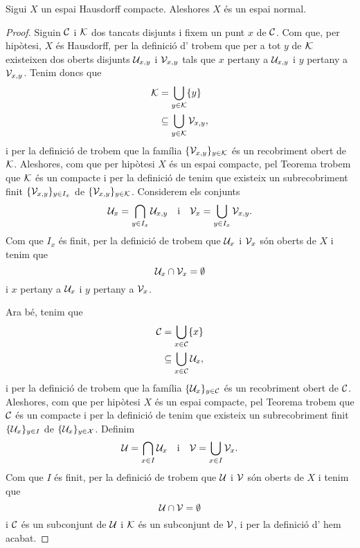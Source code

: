 \documentclass[../../Main.tex]{subfiles}
\begin{document}
	\begin{theorem}
		\label{thm:els espais Hausdorff compactes són espais normals}
		Sigui \(X\) un espai Hausdorff compacte. Aleshores \(X\) és un espai normal.
		\begin{proof} %
			Siguin \(\mathcal{C}\) i \(\mathcal{K}\) dos tancats disjunts i fixem un punt \(x\) de \(\mathcal{C}\). Com que, per hipòtesi, \(X\) és Hausdorff, per la definició d' trobem que per a tot \(y\) de \(\mathcal{K}\) existeixen dos oberts disjunts \(\mathcal{U}_{x,y}\) i \(\mathcal{V}_{x,y}\) tals que \(x\) pertany a \(\mathcal{U}_{x,y}\) i \(y\) pertany a \(\mathcal{V}_{x,y}\). Tenim doncs que
			\begin{align*}
				\mathcal{K}&=\bigcup_{y\in\mathcal{K}}\{y\} \\
				&\subseteq\bigcup_{y\in\mathcal{K}}\mathcal{V}_{x,y},
			\end{align*}
			i per la definició de  trobem que la família \(\{\mathcal{V}_{x,y}\}_{y\in\mathcal{K}}\) és un recobriment obert de \(\mathcal{K}\). Aleshores, com que per hipòtesi \(X\) és un espai compacte, pel Teorema  trobem que \(\mathcal{K}\) és un compacte i per la definició de  tenim que existeix un subrecobriment finit \(\{\mathcal{V}_{x,y}\}_{y\in I_{x}}\) de \(\{\mathcal{V}_{x,y}\}_{y\in\mathcal{K}}\). Considerem els conjunts
			\[
			    \mathcal{U}_{x}=\bigcap_{y\in I_{x}}\mathcal{U}_{x,y}\quad\text{i}\quad\mathcal{V}_{x}=\bigcup_{y\in I_{x}}\mathcal{V}_{x,y}.
			\]
			Com que \(I_{x}\) és finit, per la definició de  trobem que \(\mathcal{U}_{x}\) i \(\mathcal{V}_{x}\) són oberts de \(X\) i tenim que
			\[
			    \mathcal{U}_{x}\cap\mathcal{V}_{x}=\emptyset
			\]
			i \(x\) pertany a \(\mathcal{U}_{x}\) i \(y\) pertany a \(\mathcal{V}_{x}\).
			
			Ara bé, tenim que
			\begin{align*}
				\mathcal{C}&=\bigcup_{x\in\mathcal{C}}\{x\} \\
				&\subseteq\bigcup_{x\in\mathcal{C}}\mathcal{U}_{x},
			\end{align*}
			i per la definició de  trobem que la família \(\{\mathcal{U}_{x}\}_{y\in\mathcal{C}}\) és un recobriment obert de \(\mathcal{C}\). Aleshores, com que per hipòtesi \(X\) és un espai compacte, pel Teorema  trobem que \(\mathcal{C}\) és un compacte i per la definició de  tenim que existeix un subrecobriment finit \(\{\mathcal{U}_{x}\}_{y\in I}\) de \(\{\mathcal{U}_{x}\}_{y\in\mathcal{X}}\). Definim
			\[
			    \mathcal{U}=\bigcap_{x\in I}\mathcal{U}_{x}\quad\text{i}\quad\mathcal{V}=\bigcup_{x\in I}\mathcal{V}_{x}.
			\]
			Com que \(I\) és finit, per la definició de  trobem que \(\mathcal{U}\) i \(\mathcal{V}\) són oberts de \(X\) i tenim que
			\[
			    \mathcal{U}\cap\mathcal{V}=\emptyset
			\]
			i \(\mathcal{C}\) és un subconjunt de \(\mathcal{U}\) i \(\mathcal{K}\) és un subconjunt de \(\mathcal{V}\), i per la definició d' hem acabat.
		\end{proof}
	\end{theorem}
\end{document}
